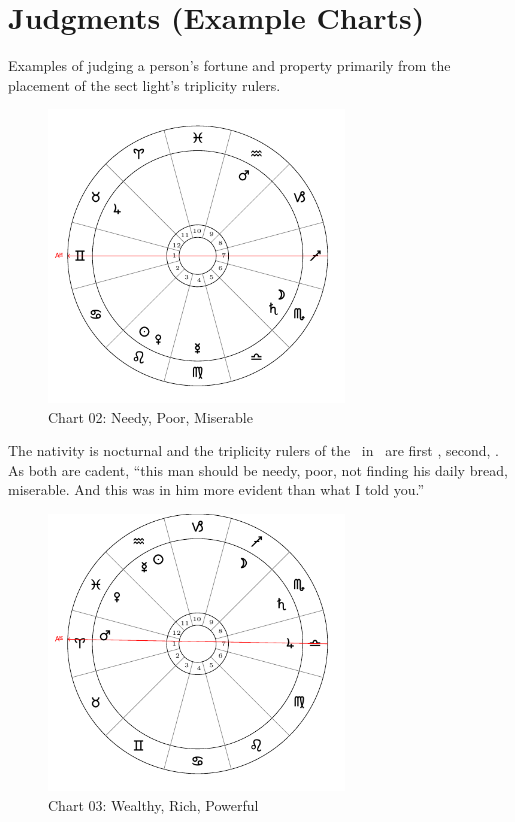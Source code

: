 \section{Judgments (Example Charts)}
Examples of judging a person's fortune and property primarily from the placement of the sect light's triplicity rulers.

\begin{figure}[H]
\centering
\includegraphics[width=0.7\textwidth]{charts/1_24_01}
\vspace{-1em}
\caption{Chart 02: Needy, Poor, Miserable}
\end{figure}

The nativity is nocturnal and the triplicity rulers of the \Moon\, in \Scorpio\, are first \Mars, second, \Venus. As both are cadent, ``this man should be needy, poor, not finding his daily bread, miserable. And this was in him more evident than what I told you.''

\begin{figure}[H]
\centering
\includegraphics[width=0.7\textwidth]{charts/1_24_02}
\vspace{-1em}
\caption{Chart 03: Wealthy, Rich, Powerful}
\end{figure}

